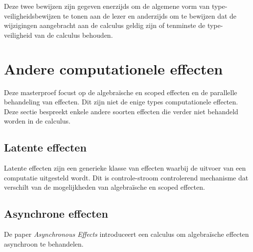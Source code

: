 Deze twee bewijzen zijn gegeven enerzijds om de algemene vorm van type-veiligheidsbewijzen te tonen aan de lezer en anderzijds om te bewijzen dat de wijzigingen aangebracht aan de calculus geldig zijn of tenminste de type-veiligheid van de calculus behouden.

\section{Andere computationele effecten}
\label{subsec:OthCompEff}
Deze masterproef focust op de algebraïsche en scoped effecten en de parallelle behandeling van effecten. Dit zijn niet de enige types computationele effecten. Deze sectie bespreekt enkele andere soorten effecten die verder niet behandeld worden in de calculus. 

\subsection{Latente effecten}
Latente effecten \cite{vandenBerg2021} zijn een generieke klasse van effecten waarbij de uitvoer van een computatie uitgesteld wordt. Dit is controle-stroom controlerend mechanisme dat verschilt van de mogelijkheden van algebraïsche en scoped effecten.

\subsection{Asynchrone effecten}
De paper \emph{Asynchronous Effects} \cite{Ahman2020} introduceert een calculus om algebraïsche effecten asynchroon te behandelen.





